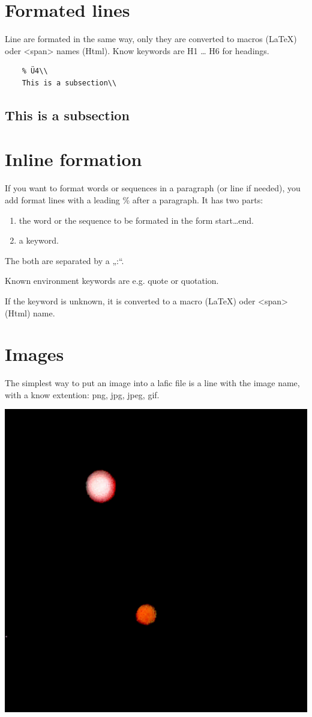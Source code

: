 \documentclass{scrartcl}
\begin{document}
\section{Formated lines}

Line are formated in the same way, only they are converted
to macros (LaTeX) oder <span> names (Html). Know keywords
are H1 … H6 for headings.

\begin{verbatim}
    % Ü4\\
    This is a subsection\\

\end{verbatim}

\subsection{This is a subsection}

\section{Inline formation}

If you want to format words or sequences in a paragraph (or
line if needed), you add format lines with a leading \% after
a paragraph. It has two parts:

\begin{enumerate}
\item the word or the sequence to be formated in the form
start…end. 
\item a keyword.

\end{enumerate}

The both are separated by a „:“.

Known environment keywords are e.g. quote or quotation.

If the keyword is unknown, it is converted to a macro
(LaTeX) oder <span> (Html) name.

\section{Images}

The simplest way to put an image into a lafic file is a
line with the image name, with a know extention: png, jpg,
jpeg, gif.

\includegraphics[width=.50\linewidth]{Image.png}
\end{document}
